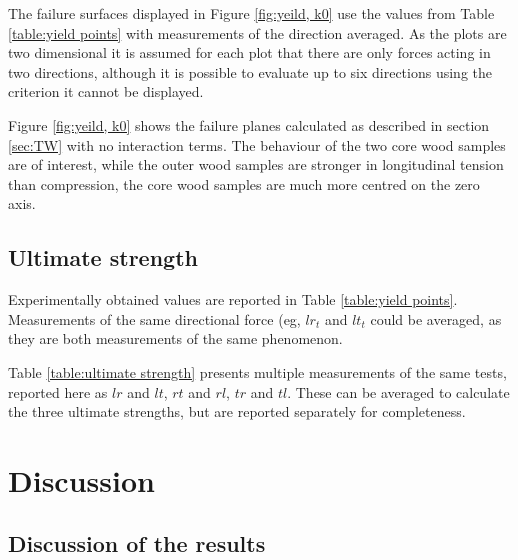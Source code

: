 \documentclass[10pt]{article}
\begin{document}
The failure surfaces displayed in Figure \ref{fig:yeild, k0} use the values from Table \ref{table:yield points} with measurements of the direction averaged. As the plots are two dimensional it is assumed for each plot that there are only forces acting in two directions, although it is possible to evaluate up to six directions using the criterion it cannot be displayed.

Figure \ref{fig:yeild, k0} shows the failure planes calculated as described in section \ref{sec:TW} with no interaction terms. The behaviour of the two core wood samples are of interest, while the outer wood samples are stronger in longitudinal tension than compression, the core wood samples are much more centred on the zero axis.

\subsection{Ultimate strength}
Experimentally obtained values are reported in Table \ref{table:yield points}. Measurements of the same directional force (eg, \(lr_t\) and \(lt_t\) could be averaged, as they are both measurements of the same  phenomenon.

Table \ref{table:ultimate strength} presents multiple measurements of the same tests, reported here as \(lr\) and \(lt\), \(rt\) and \(rl\), \(tr\) and \(tl\). These can be averaged to calculate the three ultimate strengths, but are reported separately for completeness.


\section{Discussion}
\subsection{Discussion of the results}
\label{sec:dis_results}
\end{document}
